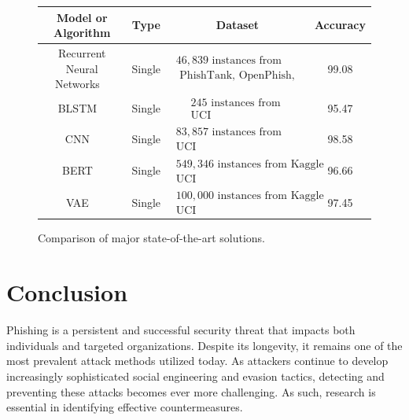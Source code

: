 \documentclass[final]{cvpr}
\begin{document}
\begin{figure}
   \begin{center}
      \begin{tabular}{cccc}
         \hline
         Model or Algorithm & Type & Dataset & Accuracy \\
         \hline
         Recurrent Neural Networks ~\cite{rangapur2021phish} & Single & $\begin{array}{c}46,839 \text { instances from } \\ \text { PhishTank, OpenPhish, and Common
Crawl }\end{array}$  & 99.08\\
         \hline
         BLSTM ~\cite{wang2021deep} & Single & $\begin{array}{c}245 \text { instances from } \\ \text {UCI}\end{array}$  & 95.47\\
        \hline
        CNN ~\cite{aljofey2021effective} & Single & $\begin{array}{c}83,857 \text { instances from PhishTank} \\ \text {UCI}\end{array}$  & 98.58\\
        \hline
        BERT ~\cite{elsadig2021intelligent} & Single & $\begin{array}{c}549,346 \text { instances from Kaggle} \\ \text {UCI}\end{array}$  & 96.66\\
        \hline
        VAE ~\cite{prabakaran2021enhanced} & Single & $\begin{array}{c}100,000 \text { instances from Kaggle ISCX‐URL‐2016} \\ \text {UCI}\end{array}$  & 97.45\\
        \hline

         \end{tabular}
   \end{center}
      \caption{Comparison of major state-of-the-art solutions.}
   \label{tab:ml-state-of-the-art}
   \end{figure}

\section{Conclusion}
\label{sec:Conclusion}
Phishing is a persistent and successful security threat that impacts both individuals and targeted organizations. Despite its longevity, it remains one of the most prevalent attack methods utilized today. As attackers continue to develop increasingly sophisticated social engineering and evasion tactics, detecting and preventing these attacks becomes ever more challenging. As such, research is essential in identifying effective countermeasures.
\end{document}
